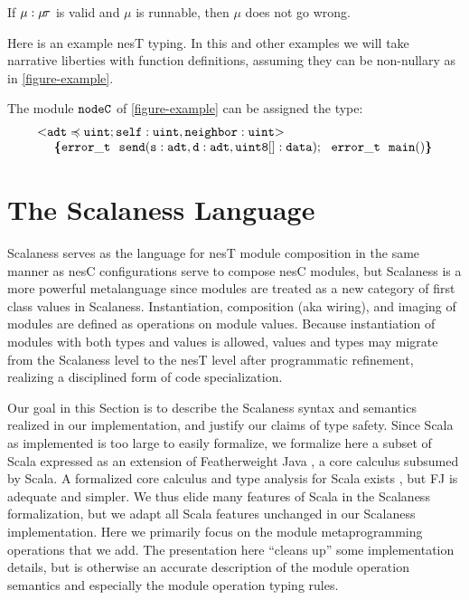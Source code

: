 \begin{conject}
If $\mu : \jmodtcat$ is valid and $\mu$ is runnable, then $\mu$ does not 
go wrong.
\end{conject}
Here is an example nesT typing. In this and other examples we will
take narrative liberties with function definitions, assuming they can
be non-nullary as in \autoref{figure-example}.
\begin{example}
\label{example-nesttyping}
The module $\tt{nodeC}$ of \autoref{figure-example} can be assigned the type:
$$
\begin{array}{l}
\margs{\tt{adt} \subtype \tt{uint}; \tt{self : uint}, \tt{neighbor : uint} \tt}\\
\ \ \ \ \lc
\tt{error\_t\ \ send}(\tt{s : adt}, \tt{d : adt}, \tt{uint8[] : data});\ \ 
\tt{error\_t\ \  main()} 
\rc
\end{array}
$$
\end{example}


\section{The Scalaness Language}
\label{section-scalaness}

Scalaness serves as the language for nesT module composition in the
same manner as nesC configurations serve to compose nesC modules, but
Scalaness is a more powerful metalanguage since modules are treated as
a new category of first class values in Scalaness.  Instantiation,
composition (aka wiring), and imaging of modules are defined as
operations on module values.  Because instantiation of modules with
both types and values is allowed, values and types may migrate from
the Scalaness level to the nesT level after programmatic refinement,
realizing a disciplined form of code specialization.

Our goal in this Section is to describe the
Scalaness syntax and semantics realized in our implementation, and
justify our claims of type safety. Since Scala as implemented is too
large to easily formalize, we formalize here a subset of Scala
expressed as an extension of Featherweight Java \cite{FJ}, a core
calculus subsumed by Scala. A formalized core calculus and type
analysis for Scala exists \cite{Cremet:2006:CCS:2135978.2135980}, but
FJ is adequate and simpler.  We thus elide many features of Scala in
the Scalaness formalization, but we adapt all Scala features unchanged
in our Scalaness implementation.  Here we primarily focus on the
module metaprogramming operations that we add.  The presentation here
``cleans up'' some implementation details, but is otherwise an
accurate description of the module operation semantics and especially
the module operation typing rules.

